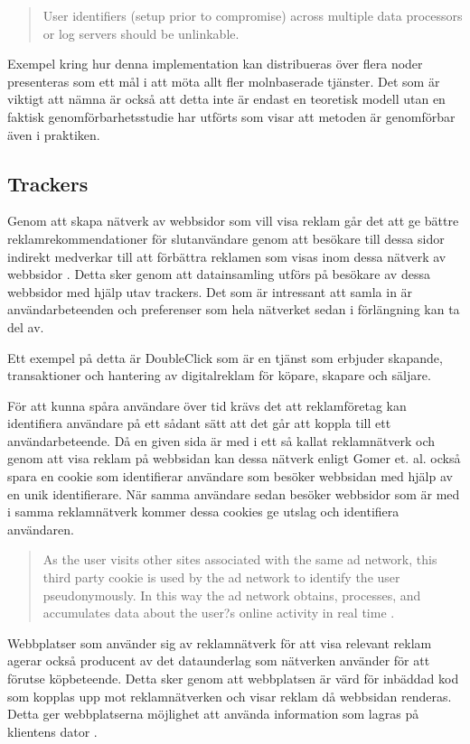 \documentclass[a4paper,11pt]{article}
\begin{document}
{\begin{quote}
User identifiers (setup prior to compromise) across multiple data processors or log servers should be unlinkable.
\end{quote}
Exempel kring hur denna implementation kan distribueras över flera noder presenteras som ett mål i att möta allt fler molnbaserade tjänster. Det som är viktigt att nämna är också att detta inte är endast en teoretisk modell utan en faktisk genomförbarhetsstudie har utförts som visar att metoden är genomförbar även i praktiken. 

\subsection{Trackers}
Genom att skapa nätverk av webbsidor som vill visa reklam går det att ge bättre reklamrekommendationer för slutanvändare genom att besökare till dessa sidor indirekt medverkar till att förbättra reklamen som visas inom dessa nätverk av webbsidor \cite{Gomer}. Detta sker genom att datainsamling utförs på besökare av dessa webbsidor med hjälp utav trackers. Det som är intressant att samla in är användarbeteenden och preferenser som hela nätverket sedan i förlängning kan ta del av. 

Ett exempel på detta är DoubleClick \cite{DoubleClick} som är en tjänst som erbjuder skapande, transaktioner och hantering av digitalreklam för köpare, skapare och säljare. 

För att kunna spåra användare över tid krävs det att reklamföretag kan identifiera användare på ett sådant sätt att det går att koppla till ett användarbeteende. Då en given sida är med i ett så kallat reklamnätverk och genom att visa reklam på webbsidan kan dessa nätverk enligt Gomer et. al. \cite{Gomer} också spara en cookie som identifierar användare som besöker webbsidan med hjälp av en unik identifierare. När samma användare sedan besöker webbsidor som är med i samma reklamnätverk kommer dessa cookies ge utslag och identifiera användaren. 

\begin{quote}
As the user visits other sites associated with the same ad network, this third party cookie is used by the ad network to identify the user pseudonymously. In this way the ad network obtains, processes, and accumulates data about the user?s online activity in real time \cite{Gomer}.
\end{quote}
Webbplatser som använder sig av reklamnätverk för att visa relevant reklam agerar också producent av det dataunderlag som nätverken använder för att förutse köpbeteende. Detta sker genom att webbplatsen är värd för inbäddad kod som kopplas upp mot reklamnätverken och visar reklam då webbsidan renderas. Detta ger webbplatserna möjlighet att använda information som lagras på klientens dator \cite{Gomer}.

}
\end{document}
